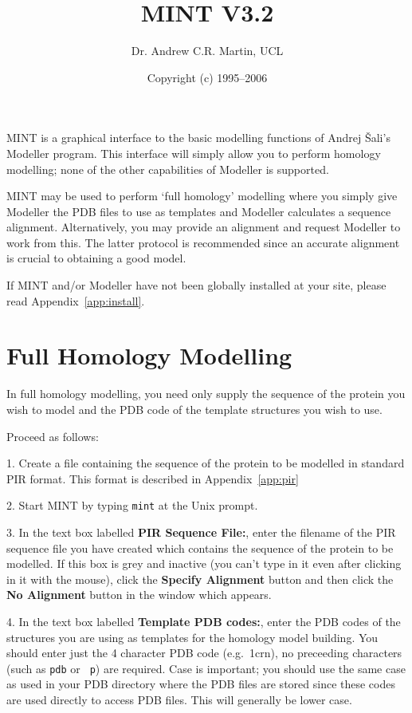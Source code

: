 \documentclass[12pt]{article}
\title{MINT V3.2}
\author{Dr. Andrew C.R. Martin, UCL}
\date{Copyright (c) 1995--2006}
\begin{document}
\maketitle

MINT is a graphical interface to the basic modelling functions of
Andrej \v{S}ali's Modeller program. This interface will simply allow you
to perform homology modelling; none of the other capabilities of
Modeller is supported. 

MINT may be used to perform `full homology' modelling where you simply
give Modeller the PDB files to use as templates and Modeller
calculates a sequence alignment. Alternatively, you may provide an
alignment and request Modeller to work from this. The latter protocol
is recommended since an accurate alignment is crucial to obtaining a
good model.

If MINT and/or Modeller have not been globally installed at your
site, please read Appendix~\ref{app:install}.


\section{Full Homology Modelling}
In full homology modelling, you need only supply the sequence of the
protein you wish to model and the PDB code of the template structures
you wish to use.
\vspace{1em}

\noindent Proceed as follows:

1. Create a file containing the sequence of the protein to be modelled
in standard PIR format. This format is described in
Appendix~\ref{app:pir}

2. Start MINT by typing {\tt mint} at the Unix prompt.

3. In the text box labelled {\bfseries PIR Sequence File:}, enter the
filename of the PIR sequence file you have created which contains the
sequence of the protein to be modelled. If this box is grey and
inactive (you can't type in it even after clicking in it with the
mouse), click the {\bfseries Specify Alignment} button and then click
the {\bfseries No Alignment} button in the window which appears.

4. In the text box labelled {\bfseries Template PDB codes:}, enter the
PDB codes of the structures you are using as templates for the
homology model building. You should enter just the 4 character PDB
code (e.g.\ 1crn), no preceeding characters (such as {\tt pdb} or {\tt
p}) are required. Case is important; you should use the same case as
used in your PDB directory where the PDB files are stored since these
codes are used directly to access PDB files. This will generally be
lower case.
\end{document}
